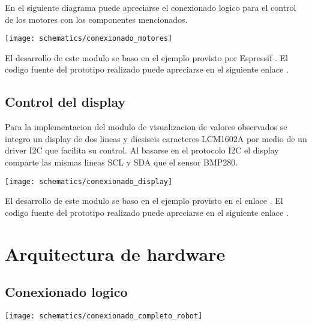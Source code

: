 En el siguiente diagrama puede apreciarse el conexionado logico para el control de los motores con los componentes mencionados.

\begin{center}
  \texttt{[image: schematics/conexionado\_motores]}
    \label{fig:conexionado_motores}
\end{center}

El desarrollo de este modulo se baso en el ejemplo provisto por Espressif \cite{ESP32_MCPWM_example}. El codigo fuente del prototipo realizado puede apreciarse en el siguiente enlace \cite{ESP32_POC_motor_MCPWM}.



\subsection{Control del display}

Para la implementacion del modulo de visualizacion de valores observados se integro un display de dos lineas y diesiseis caracteres LCM1602A por medio de un driver I2C que facilita su control. Al basarse en el protocolo I2C el display comparte las mismas lineas SCL y SDA que el sensor BMP280. 

\begin{center}
  \texttt{[image: schematics/conexionado\_display]}
    \label{fig:conexionado_display}

\end{center}


El desarrollo de este modulo se baso en el ejemplo provisto en el enlace \cite{ESP32_Display_Example}. El codigo fuente del prototipo realizado puede apreciarse en el siguiente enlace \cite{ESP32_POC_display}.


\section{Arquitectura de hardware}


\subsection{Conexionado logico }


\begin{center}
  \texttt{[image: schematics/conexionado\_completo\_robot]}
    \label{fig:conexionado_completo_robot}
\end{center}


